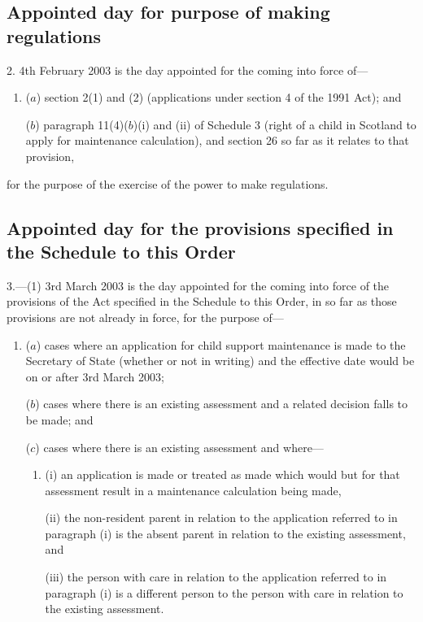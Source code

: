 \documentclass[12pt,a4paper]{article}
\begin{document}
\subsection[2. Appointed day for purpose of making regulations]{Appointed day for purpose of making regulations}

2.  4th February 2003 is the day appointed for the coming into force of—
\begin{enumerate}\item[]
($a$) section 2(1) and (2) (applications under section 4 of the 1991 Act); and

($b$) paragraph 11(4)($b$)(i)  and (ii)  of Schedule 3 (right of a child in Scotland to apply for maintenance calculation), and section 26 so far as it relates to that provision,
\end{enumerate}
for the purpose of the exercise of the power to make regulations.

\subsection[3. Appointed day for the provisions specified in the Schedule to this Order]{Appointed day for the provisions specified in the Schedule to this Order}

3.---(1)  3rd March 2003 is the day appointed for the coming into force of the provisions of the Act specified in the Schedule to this Order, in so far as those provisions are not already in force, for the purpose of—
\begin{enumerate}\item[]
($a$) cases where an application for child support maintenance is made to the Secretary of State (whether or not in writing) and the effective date would be on or after 3rd March 2003;

($b$) cases where there is an existing assessment and a related decision falls to be made; and

($c$) cases where there is an existing assessment and where—
\begin{enumerate}\item[]
(i) an application is made or treated as made which would but for that assessment result in a maintenance calculation being made,

(ii) the non-resident parent in relation to the application referred to in paragraph (i)  is the absent parent in relation to the existing assessment, and

(iii) the person with care in relation to the application referred to in paragraph (i)  is a different person to the person with care in relation to the existing assessment.
\end{enumerate}
\end{enumerate}
\end{document}
